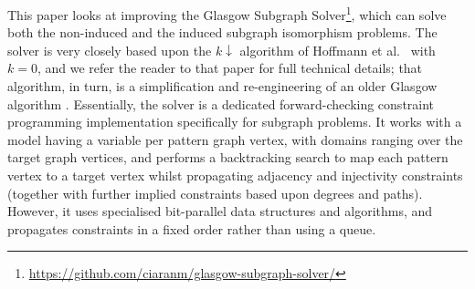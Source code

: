 \documentclass[runningheads]{llncs}
\newcommand{\citet}[2]{#1\cite{#2}}
\begin{document}
This paper looks at improving the Glasgow Subgraph
Solver\footnote{\url{https://github.com/ciaranm/glasgow-subgraph-solver/}}, which can solve both the
non-induced and the induced subgraph isomorphism problems.  The solver is very closely based upon
the $k{\downarrow}$ algorithm of \citet{Hoffmann et al.\ }{DBLP:conf/aaai/HoffmannMR17} with $k =
0$, and we refer the reader to that paper for full technical details; that algorithm, in turn, is a
simplification and re-engineering of an older Glasgow algorithm
\cite{DBLP:conf/cp/McCreeshP15,DBLP:conf/lion/KotthoffMS16}.  Essentially, the solver is
a dedicated forward-checking constraint programming implementation specifically for subgraph
problems. It works with a model having a variable per pattern graph vertex, with domains ranging
over the target graph vertices, and performs a backtracking search to map each pattern vertex to a
target vertex whilst propagating adjacency and injectivity constraints (together with further
implied constraints based upon degrees and paths).  However, it uses specialised bit-parallel data
structures and algorithms, and propagates constraints in a fixed order rather than using a queue.
\end{document}
